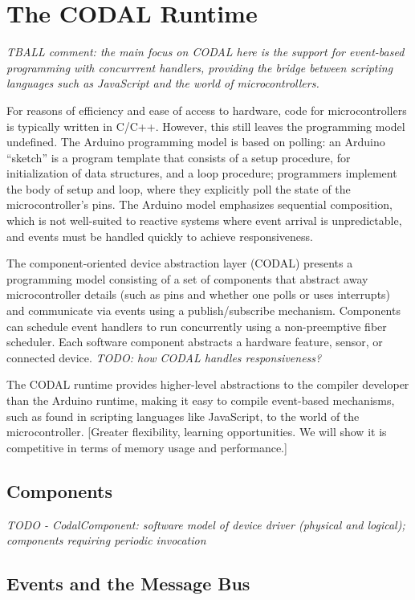 \section{The CODAL Runtime}
\label{sec:codal}

\emph{TBALL comment: the main focus on CODAL here is the support for event-based programming with concurrrent handlers,
   providing the bridge between scripting languages such as JavaScript and the world of microcontrollers. }

For reasons of efficiency and ease of access to hardware, code for microcontrollers is typically written in C/C++. 
However, this still leaves the programming model undefined. The Arduino programming model is based on polling: 
an Arduino ``sketch'' is a program template that consists of a setup procedure, for initialization of data structures,
and a loop procedure; programmers implement the body of setup and loop, where they explicitly poll the state of the
microcontroller’s pins. The Arduino model emphasizes sequential composition, which is not well-suited to reactive
systems where event arrival is unpredictable, and events must be handled quickly to achieve responsiveness.

The component-oriented device abstraction layer (CODAL) presents a programming model consisting of a set of
components that abstract away microcontroller details (such as pins and whether one polls or uses interrupts)
and communicate via events using a publish/subscribe mechanism.  Components can schedule event handlers to run
concurrently using a non-preemptive fiber scheduler. Each software component abstracts a hardware feature, sensor,
or connected device. \emph{TODO: how CODAL handles responsiveness?}

The CODAL runtime provides higher-level abstractions to the compiler developer than the Arduino runtime, making it
easy to compile event-based mechanisms, such as found in scripting languages like JavaScript, to the world of the
microcontroller.  [Greater flexibility, learning opportunities. We will show it is competitive in terms of memory
usage and performance.]

\subsection{Components}

\emph{TODO - CodalComponent: software model of device driver (physical and logical); components requiring periodic invocation}

\subsection{Events and the Message Bus}

